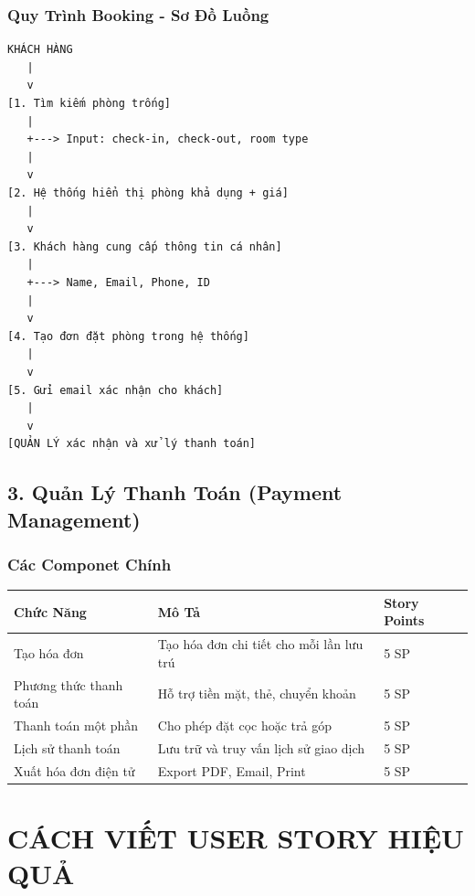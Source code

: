 \documentclass[12pt, a4paper]{report}
\begin{document}
\subsection{Quy Trình Booking - Sơ Đồ Luồng}

\begin{tcolorbox}[colback=gray!10]
\begin{verbatim}
KHÁCH HÀNG
   |
   v
[1. Tìm kiếm phòng trống] 
   |
   +---> Input: check-in, check-out, room type
   |
   v
[2. Hệ thống hiển thị phòng khả dụng + giá]
   |
   v
[3. Khách hàng cung cấp thông tin cá nhân]
   |
   +---> Name, Email, Phone, ID
   |
   v
[4. Tạo đơn đặt phòng trong hệ thống]
   |
   v
[5. Gửi email xác nhận cho khách]
   |
   v
[QUẢN LÝ xác nhận và xử lý thanh toán]
\end{verbatim}
\end{tcolorbox}

\section{3. Quản Lý Thanh Toán (Payment Management)}

\subsection{Các Componet Chính}

\begin{table}[h]
\centering
\begin{tabular}{|l|p{5cm}|p{4cm}|}
\hline
\textbf{Chức Năng} & \textbf{Mô Tả} & \textbf{Story Points} \\
\hline
Tạo hóa đơn & Tạo hóa đơn chi tiết cho mỗi lần lưu trú & 5 SP \\
\hline
Phương thức thanh toán & Hỗ trợ tiền mặt, thẻ, chuyển khoản & 5 SP \\
\hline
Thanh toán một phần & Cho phép đặt cọc hoặc trả góp & 5 SP \\
\hline
Lịch sử thanh toán & Lưu trữ và truy vấn lịch sử giao dịch & 5 SP \\
\hline
Xuất hóa đơn điện tử & Export PDF, Email, Print & 5 SP \\
\hline
\end{tabular}
\end{table}

\newpage

\chapter{CÁCH VIẾT USER STORY HIỆU QUẢ}
\end{document}
